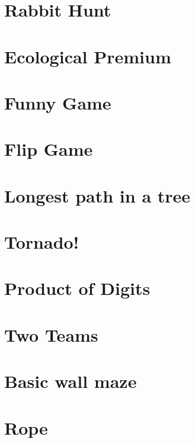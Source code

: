 \newpage
\section{Rabbit Hunt}


\newpage
\section{Ecological Premium}


\newpage
\section{Funny Game}


\newpage
\section{Flip Game}


\newpage
\section{Longest path in a tree}


\newpage
\section{Tornado!}


\newpage
\section{Product of Digits}


\newpage
\section{Two Teams}


\newpage
\section{Basic wall maze}


\newpage
\section{Rope}


